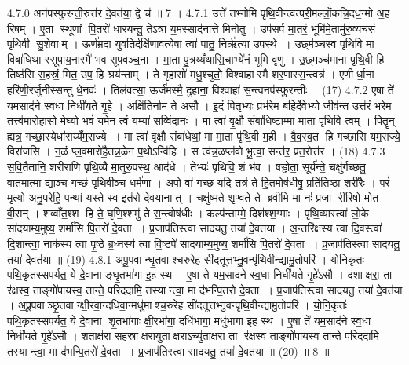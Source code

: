 4.7.0
अन॑पस्फुरन्ती॒रुत्त॑र दे॒वत॑या॒ द्वे च॑ ॥ 7 ।
4.7.1
उत्ते॑ तभ्नोमि पृथि॒वीन्त्वत्परी॒मल्लों॒कन्नि॒दध॒न्मो अ॒ह रि॑षम् । ए॒ता स्थूणां पि॒तरो॑ धारयन्तु॒ तेऽत्रा॑ य॒मस्साद॑नात्ते मिनोतु । उप॑सर्प मा॒तरं॒ भूमि॑मे॒तामु॑रु॒व्यच॑सं पृथि॒वी सु॒शेवाम् । ऊर्ण॑म्रदा युव॒तिर्दक्षि॑णावत्ये॒षा त्वा॑ पातु॒ निर्\mbox{}ऋ॑त्या उ॒पस्थे । उछ्म॑ञ्चस्व पृथिवि॒ मा विबा॑धिथा स्सूपाय॒नास्मै॑ भव सूपवञ्च॒ना । मा॒ता पु॒त्रय्यँथा॑सि॒चाभ्ये॑नं भूमि वृणु । उ॒छ्मञ्च॑माना पृथि॒वी हि तिष्ठ॑सि स॒हस्रं॒ मित॒ उप॒ हि श्रय॑न्ताम् । ते गृ॒हासो॑ मधु॒श्चुतो॒ विश्वाहास्मै शर॒णास्स॒न्त्वत्र॑ । एणीर्धा॒ना हरि॑णी॒रर्जु॑नीस्सन्तु धे॒नवः॑ । तिल॑वत्सा॒ ऊर्ज॑मस्मै॒ दुहा॑ना॒ विश्वाहा॑ स॒न्त्वनप॑स्फुरन्तीः । (17)
4.7.2
ए॒षा ते॑ यम॒साद॑ने स्व॒धा निधी॑यते गृ॒हे । अक्षि॑ति॒र्नाम॑ ते असौ । इ॒दं पि॒तृभ्यः॒ प्रभ॑रेम ब॒र्\mbox{}हिर्दे॒वेभ्यो॒ जीव॑न्त॒ उत्त॑रं भरेम । तत्त्व॑मारो॒हासो॒ मेघ्यो॒ भवं॑ य॒मेन॒ त्वं य॒म्या॑ सव्विंदा॒नः । मा त्वा॑ वृ॒क्षौ संबा॑धिष्टा॒म्मा मा॒ता पृ॑थिवि॒ त्वम् । पि॒तॄन् ह्यत्र॒ गच्छा॒स्येधा॑सय्यँम॒राज्ये । मा त्वा॑ वृ॒क्षौ संबा॑धेथां॒ मा मा॒ता पृ॑थि॒वी म॒ही । वै॒व॒स्व॒त हि गच्छा॑सि यम॒राज्ये॒ विरा॑जसि । न॒ळं प्ल॒वमारो॑है॒तन्न॒ळेन॑ प॒थोऽन्वि॑हि । स त्व॑न्न॒ळप्ल॑वो भू॒त्वा॒ सन्त॑र॒ प्रत॒रोत्त॑र । (18)
4.7.3
स॒वि॒तैतानि॒ शरी॑राणि पृथि॒व्यै मा॒तुरु॒पस्थ॒ आद॑धे । तेभ्यः॑ पृथिवि॒ शं भ॑व । षड्ढो॑ता॒ सूर्य॑न्ते॒ चक्षु॑र्गच्छतु॒ वात॑मा॒त्मा द्याञ्च॒ गच्छ॑ पृथि॒वीञ्च॒ धर्म॑णा । अ॒पो वा॑ गच्छ॒ यदि॒ तत्र॑ ते हि॒तमोष॑धीषु॒ प्रति॑तिष्ठा॒ शरी॑रैः । परं॑ मृत्यो॒ अनु॒परे॑हि॒ पन्थां॒ यस्ते॒ स्व इत॑रो देव॒यानात् । चक्षु॑ष्मते शृण्व॒ते ते ब्रवीमि॒ मा नः॑ प्र॒जा री॑रिषो॒ मोत वी॒रान् । शव्वाँत॒श्श हि ते॒ घृणि॒श्शमु॑ ते स॒न्त्वोष॑धीः । कल्प॑न्ताम्मे॒ दिश॑श्श॒ग्माः । पृ॒थि॒व्यास्त्वा॑ लो॒के सा॑दयाम्य॒मुष्य॒ शर्मा॑सि पि॒तरो॑ दे॒वता । प्र॒जाप॑तिस्त्वा सादयतु॒ तया॑ दे॒वत॑या । अ॒न्तरि॑क्षस्य त्वा दि॒वस्त्वा॑ दि॒शान्त्वा॒ नाक॑स्य त्वा पृ॒ष्ठे ब्र॒ध्नस्य॑ त्वा वि॒ष्टपे॑ सादयाम्य॒मुष्य॒ शर्मा॑सि पि॒तरो॑ दे॒वता । प्र॒जाप॑तिस्त्वा सादयतु॒ तया॑ दे॒वत॑या ॥ (19)
4.8.1
अ॒पू॒पवान्घृ॒तवाश्च॒रुरेह सी॑दतूत्तभ्नु॒वन्पृ॑थि॒वीन्द्यामु॒तोपरि॑ । यो॒नि॒कृतः॑ पथि॒कृत॑स्सपर्यत॒ ये दे॒वानाङ्घृ॒तभा॑गा इ॒ह स्थ । ए॒षा ते यम॒साद॑ने स्व॒धा निधी॑यते गृ॒हे॑ऽसौ । दशाक्षरा॒ ता र॑क्षस्व॒ ताङ्गो॑पायस्व॒ तान्ते॒ परि॑ददामि॒ तस्यान्त्वा॒ मा द॑भन्पि॒तरो॑ दे॒वता । प्र॒जाप॑तिस्त्वा सादयतु॒ तया॑ दे॒वत॑या । अ॒पू॒पवाञ्छृ॒तवान्क्षी॒रवा॒न्दधि॑वा॒न्मधु॑माश्च॒रुरेह सी॑दतूत्तभ्नु॒वन्पृ॑थि॒वीन्द्यामु॒तोपरि॑ । यो॒नि॒कृतः॑ पथि॒कृत॑स्सपर्यत॒ ये दे॒वाना शृ॒तभा॑गाः क्षी॒रभा॑गा॒ दधि॑भागा॒ मधु॑भागा इ॒ह स्थ । ए॒षा ते॑ यम॒साद॑ने स्व॒धा निधी॑यते गृ॒हे॑ऽसौ । श॒ताक्ष॑रा स॒हस्राक्षरा॒युताक्ष॒राऽच्यु॑ताक्षरा॒ ता र॑क्षस्व॒ ताङ्गो॑पायस्व॒ तान्ते॒ परि॑ददामि॒ तस्यान्त्वा॒ मा द॑भन्पि॒तरो॑ दे॒वता । प्र॒जाप॑तिस्त्वा सादयतु॒ तया॑ दे॒वत॑या ॥ (20) ॥ 8 ॥
\anuvakamend

